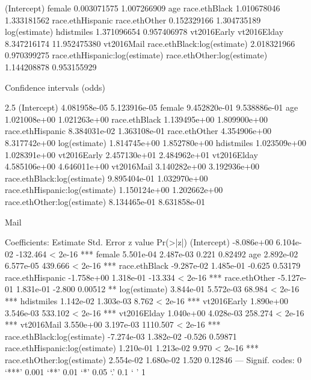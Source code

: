 (Intercept)                         female
0.003071575                    1.007266909
        age                  race.ethBlack
1.010678046                    1.333181562
race.ethHispanic                  race.ethOther
0.152329166                    1.304735189
log(estimate)                     hdistmiles
1.371096654                    0.957406978
vt2016Early                    vt2016Elday
8.347216174                   11.952475380
 vt2016Mail    race.ethBlack:log(estimate)
2.018321966                    0.970399275
race.ethHispanic:log(estimate)    race.ethOther:log(estimate)
1.144208878                    0.953155929


Confidence intervals (odds)

2.5 %
(Intercept)                    4.081958e-05 5.123916e-05
female                         9.452820e-01 9.538886e-01
age                            1.021008e+00 1.021263e+00
race.ethBlack                  1.139495e+00 1.809900e+00
race.ethHispanic               8.384031e-02 1.363108e-01
race.ethOther                  4.354906e+00 8.317742e+00
log(estimate)                  1.814745e+00 1.852780e+00
hdistmiles                     1.023509e+00 1.028391e+00
vt2016Early                    2.457130e+01 2.484962e+01
vt2016Elday                    4.585106e+00 4.646011e+00
vt2016Mail                     3.140282e+00 3.192936e+00
race.ethBlack:log(estimate)    9.895404e-01 1.032970e+00
race.ethHispanic:log(estimate) 1.150124e+00 1.202662e+00
race.ethOther:log(estimate)    8.134465e-01 8.631858e-01



Mail

Coefficients:
                                 Estimate Std. Error  z value Pr(>|z|)
(Intercept)                    -8.086e+00  6.104e-02 -132.464  < 2e-16 ***
female                          5.501e-04  2.487e-03    0.221  0.82492
age                             2.892e-02  6.577e-05  439.666  < 2e-16 ***
race.ethBlack                  -9.287e-02  1.485e-01   -0.625  0.53179
race.ethHispanic               -1.758e+00  1.318e-01  -13.334  < 2e-16 ***
race.ethOther                  -5.127e-01  1.831e-01   -2.800  0.00512 **
log(estimate)                   3.844e-01  5.572e-03   68.984  < 2e-16 ***
hdistmiles                      1.142e-02  1.303e-03    8.762  < 2e-16 ***
vt2016Early                     1.890e+00  3.546e-03  533.102  < 2e-16 ***
vt2016Elday                     1.040e+00  4.028e-03  258.274  < 2e-16 ***
vt2016Mail                      3.550e+00  3.197e-03 1110.507  < 2e-16 ***
race.ethBlack:log(estimate)    -7.274e-03  1.382e-02   -0.526  0.59871
race.ethHispanic:log(estimate)  1.210e-01  1.213e-02    9.970  < 2e-16 ***
race.ethOther:log(estimate)     2.554e-02  1.680e-02    1.520  0.12846
---
Signif. codes:  0 ‘***’ 0.001 ‘**’ 0.01 ‘*’ 0.05 ‘.’ 0.1 ‘ ’ 1

